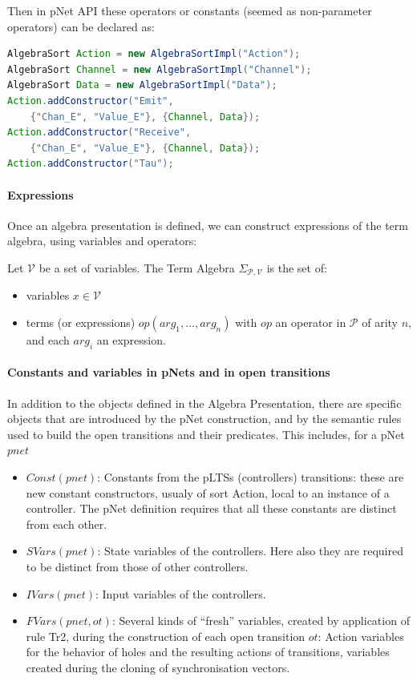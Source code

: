 \documentclass{lncs/llncs}
\begin{document}
Then in pNet API these operators or constants (seemed as non-parameter operators) can be declared as:
\begin{lstlisting}[basicstyle=\footnotesize\ttfamily, language=java, frame=single]
AlgebraSort Action = new AlgebraSortImpl("Action");
AlgebraSort Channel = new AlgebraSortImpl("Channel");
AlgebraSort Data = new AlgebraSortImpl("Data");
Action.addConstructor("Emit", 
	{"Chan_E", "Value_E"}, {Channel, Data});
Action.addConstructor("Receive", 
	{"Chan_E", "Value_E"}, {Channel, Data});
Action.addConstructor("Tau");
\end{lstlisting}


\paragraph{Expressions}
Once an algebra presentation is defined, we can construct expressions
of the term algebra, using variables and operators:

\begin{definition}
  Let $\mathcal{V}$ be a set of variables. The Term Algebra
  $\Sigma_{\mathcal{P},\mathcal{V}}$ is the set of:
  \begin{itemize}
  \item variables $x \in \mathcal{V}$
  \item terms (or expressions) $op (arg_1, ... , arg_n)$ with $op$ an operator in
  $\mathcal{P}$ of arity $n$, and each $arg_i$ an expression.
  \end{itemize} 
\end{definition}

\paragraph{Constants and variables in pNets and in open transitions}

In addition to the objects defined in the Algebra Presentation, there are
specific objects that are introduced by the pNet construction, and by
the semantic rules used to build the open transitions and their
predicates. This includes, for a pNet $pnet$
\begin{itemize}
\item $Const(pnet)$: Constants from the pLTSs (controllers) transitions: these are
  new constant constructors, usualy of sort Action, local to an
  instance of a controller. The pNet definition requires that all
  these constants are distinct from each other.
\item $SVars(pnet)$: State variables of the controllers. Here also they are required
  to be distinct from those of other controllers.
\item $IVars(pnet)$: Input variables of the controllers.
\item $FVars(pnet,ot)$: Several kinds of ``fresh'' variables, created by application of
  rule Tr2, during the construction of each open transition $ot$:
  Action variables for the behavior of holes and the 
  resulting actions of transitions, variables created during the cloning
  of synchronisation vectors.
\end{itemize}
\end{document}
